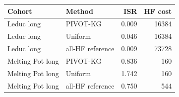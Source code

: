 \begin{tabular}{@{}llrr@{}}
\toprule
Cohort & Method & ISR & HF cost \\
\midrule
Leduc long & PIVOT-KG & 0.009 & 16384 \\
Leduc long & Uniform & 0.046 & 16384 \\
Leduc long & all-HF reference & 0.009 & 73728 \\
Melting Pot long & PIVOT-KG & 0.836 & 160 \\
Melting Pot long & Uniform & 1.742 & 160 \\
Melting Pot long & all-HF reference & 0.750 & 544 \\
\bottomrule
\end{tabular}
